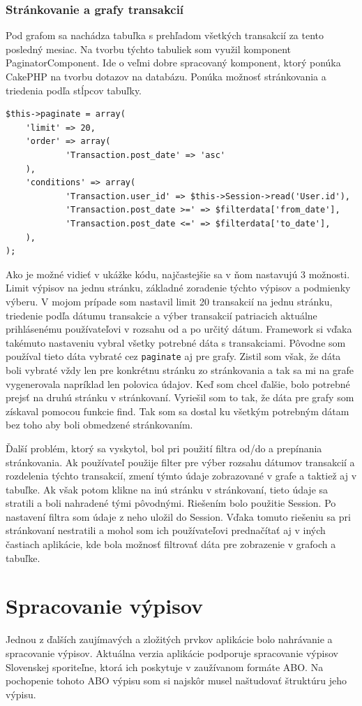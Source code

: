\documentclass[12pt,oneside]{book}
\begin{document}
\subsubsection{Stránkovanie a grafy transakcií}
Pod grafom sa nachádza tabuľka s prehľadom všetkých transakcií za tento posledný mesiac. Na tvorbu týchto tabuliek som využil komponent PaginatorComponent. Ide o veľmi dobre spracovaný komponent, ktorý ponúka CakePHP na tvorbu dotazov na databázu. Ponúka možnosť stránkovania a triedenia podľa stĺpcov tabuľky. 
\begin{lstlisting}
$this->paginate = array(
	'limit' => 20,
	'order' => array(
			'Transaction.post_date' => 'asc'
	),
	'conditions' => array(
			'Transaction.user_id' => $this->Session->read('User.id'),
			'Transaction.post_date >=' => $filterdata['from_date'],
			'Transaction.post_date <=' => $filterdata['to_date'],
	),
); 
\end{lstlisting}
Ako je možné vidieť v ukážke kódu, najčastejšie sa v ňom nastavujú 3 možnosti. Limit výpisov na jednu stránku, základné zoradenie týchto výpisov a podmienky výberu. V mojom prípade som nastavil limit 20 transakcií na jednu stránku, triedenie podľa dátumu transakcie a výber transakcií patriacich aktuálne prihlásenému používateľovi v rozsahu od a po určitý dátum. Framework si vďaka takémuto nastaveniu vybral všetky potrebné dáta s transakciami. Pôvodne som používal tieto dáta vybraté cez \texttt{paginate} aj pre grafy. Zistil som však, že dáta boli vybraté vždy len pre konkrétnu stránku zo stránkovania a tak sa mi na grafe vygenerovala napríklad len polovica údajov. Keď som chcel ďalšie, bolo potrebné prejsť na druhú stránku v stránkovaní. Vyriešil som to tak, že dáta pre grafy som získaval pomocou funkcie find. Tak som sa dostal ku všetkým potrebným dátam bez toho aby boli obmedzené stránkovaním.  

Ďalší problém, ktorý sa vyskytol, bol pri použití filtra od/do a prepínania stránkovania. Ak používateľ použije filter pre výber rozsahu dátumov transakcií a rozdelenia týchto transakcií, zmení týmto údaje zobrazované v grafe a taktiež aj v tabuľke. Ak však potom klikne na inú stránku v stránkovaní, tieto údaje sa stratili a boli nahradené tými pôvodnými. Riešením bolo použitie Session. Po nastavení filtra som údaje z neho uložil do Session. Vďaka tomuto riešeniu sa pri stránkovaní nestratili a mohol som ich používateľovi prednačítať aj v iných častiach aplikácie, kde bola možnosť filtrovať dáta pre zobrazenie v grafoch a tabuľke.

\section{Spracovanie výpisov}
Jednou z ďalších zaujímavých a zložitých prvkov aplikácie bolo nahrávanie a spracovanie výpisov. Aktuálna verzia aplikácie podporuje spracovanie výpisov Slovenskej sporiteľne, ktorá ich poskytuje v zaužívanom formáte ABO. Na pochopenie tohoto ABO výpisu som si najskôr musel naštudovať štruktúru jeho výpisu. 
\end{document}
